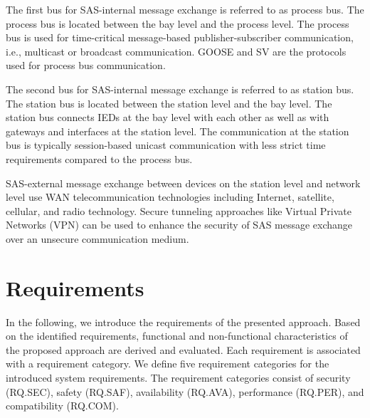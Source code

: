The first bus for SAS-internal message exchange is referred to as process bus.
The process bus is located between the bay level and the process level.
The process bus is used for time-critical message-based publisher-subscriber communication, i.e., multicast or broadcast communication.
GOOSE and SV are the protocols used for process bus communication.

The second bus for SAS-internal message exchange is referred to as station bus.
The station bus is located between the station level and the bay level.
The station bus connects IEDs at the bay level with each other as well as with gateways and interfaces at the station level.
The communication at the station bus is typically session-based unicast communication with less strict time requirements compared to the process bus.

SAS-external message exchange between devices on the station level and network level use WAN telecommunication technologies including Internet, satellite, cellular, and radio technology.
Secure tunneling approaches like Virtual Private Networks (VPN) can be used to enhance the security of SAS message exchange over an unsecure communication medium.

\section{Requirements}
\label{sec:approach:requirements}
In the following, we introduce the requirements of the presented approach.
Based on the identified requirements, functional and non-functional characteristics of the proposed approach are derived and evaluated.
Each requirement is associated with a requirement category.
We define five requirement categories for the introduced system requirements.
The requirement categories consist of security (RQ.SEC), safety (RQ.SAF), availability (RQ.AVA), performance (RQ.PER), and compatibility (RQ.COM).

